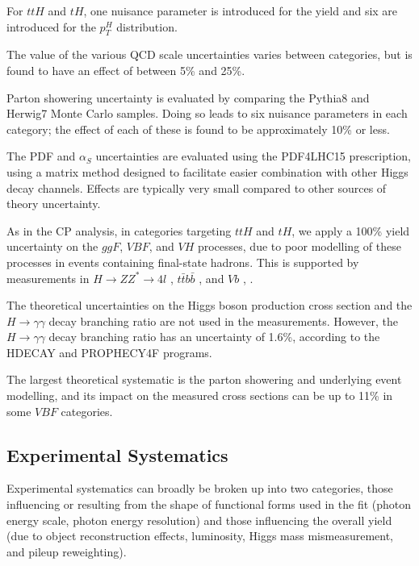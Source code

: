 For $ttH$ and $tH$, one nuisance parameter is introduced for the yield and six are introduced for the $p_{T}^{H}$ distribution.

The value of the various QCD scale uncertainties varies between categories, but is found to have an effect of between 5\% and 25\%.

Parton showering uncertainty is evaluated by comparing the Pythia8 and Herwig7 Monte Carlo samples. Doing so leads to six nuisance parameters in each category; the effect of each of these is found to be approximately 10\% or less.

The PDF and $\alpha_{S}$ uncertainties are evaluated using the PDF4LHC15 \cite{PDF4LHC} prescription, using a matrix method designed to facilitate easier combination with other Higgs decay channels. Effects are typically very small compared to other sources of theory uncertainty.

As in the CP analysis, in categories targeting $ttH$ and $tH$, we apply a 100\% yield uncertainty on the $ggF$, $VBF$, and $VH$ processes, due to poor modelling of these processes in events containing final-state hadrons. This is supported by measurements in $H \rightarrow ZZ^{*}\rightarrow 4l$ \cite{HZZ4l}, $t\bar{t}b\bar{b}$ \cite{ttbb}, and $Vb$ \cite{Wb}, \cite{Zb}.

The theoretical uncertainties on the Higgs boson production cross section and the $H \rightarrow \gamma \gamma$ decay branching ratio are not used in the measurements. However, the $H \rightarrow \gamma \gamma$ decay branching ratio has an uncertainty of 1.6\%, according to the HDECAY and PROPHECY4F programs.

The largest theoretical systematic is the parton showering and underlying event modelling, and its impact on the measured cross sections can be up to 11\% in some $VBF$ categories. 

\subsection{Experimental Systematics} \label{subsec:Experimentalsysts}

Experimental systematics can broadly be broken up into two categories, those influencing or resulting from the shape of functional forms used in the fit (photon energy scale, photon energy resolution) and those influencing the overall yield (due to object reconstruction effects, luminosity, Higgs mass mismeasurement, and pileup reweighting).

